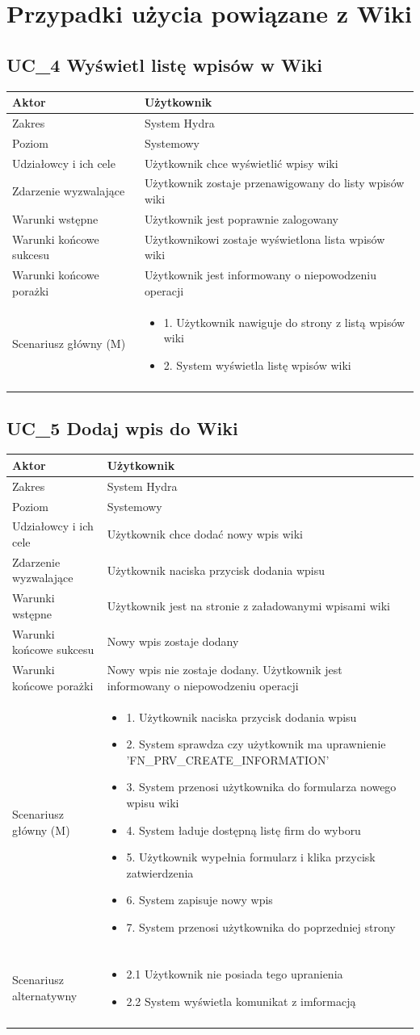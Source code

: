 \documentclass[oneside]{scrreprt}
\newcommand\addheading[2]{#1 &#2\\ \hline}
\newcommand\tabularhead{\begin{center} \begin{tabular}{lp{8cm}}
		\hline
	}
\newcommand\addmulrow[2]{ \begin{minipage}[t][][t]{6cm}#1\end{minipage}%
		&\begin{minipage}[t][][t]{8cm}
			\begin{itemize} #2 \newline \end{itemize}
		\end{minipage}\\ \\  \hline}
\newenvironment{usecase}{\tabularhead}
	{\hline\end{tabular} \end{center}}
\begin{document}
\section{Przypadki użycia powiązane z Wiki}
\subsection{UC\_4 Wyświetl listę wpisów w Wiki}
\begin{usecase}
	\addheading{Aktor}{Użytkownik} 
	\addheading{Zakres}{System Hydra}
	\addheading{Poziom}{Systemowy}
	\addheading{Udziałowcy i ich cele}{Użytkownik chce wyświetlić wpisy wiki}
	\addheading{Zdarzenie wyzwalające}{Użytkownik zostaje przenawigowany do listy wpisów wiki}
	\addheading{Warunki wstępne}{Użytkownik jest poprawnie zalogowany}
	\addheading{Warunki końcowe sukcesu}{Użytkownikowi zostaje wyświetlona lista wpisów wiki}
	\addheading{Warunki końcowe porażki}{Użytkownik jest informowany o niepowodzeniu operacji}
	\addmulrow{Scenariusz główny (M)}{
		\item[] 1. Użytkownik nawiguje do strony z listą wpisów wiki
		\item[] 2. System wyświetla listę wpisów wiki
	}
\end{usecase}
\subsection{UC\_5 Dodaj wpis do Wiki}
\begin{usecase}
	\addheading{Aktor}{Użytkownik} 
	\addheading{Zakres}{System Hydra}
	\addheading{Poziom}{Systemowy}
	\addheading{Udziałowcy i ich cele}{Użytkownik chce dodać nowy wpis wiki}
	\addheading{Zdarzenie wyzwalające}{Użytkownik naciska przycisk dodania wpisu}
	\addheading{Warunki wstępne}{Użytkownik jest na stronie z załadowanymi wpisami wiki}
	\addheading{Warunki końcowe sukcesu}{Nowy wpis zostaje dodany}
	\addheading{Warunki końcowe porażki}{Nowy wpis nie zostaje dodany. Użytkownik jest informowany o niepowodzeniu operacji}
	\addmulrow{Scenariusz główny (M)}{
		\item[] 1. Użytkownik naciska przycisk dodania wpisu
		\item[] 2. System sprawdza czy użytkownik ma uprawnienie 'FN\_PRV\_CREATE\_INFORMATION'
		\item[] 3. System przenosi użytkownika do formularza nowego wpisu wiki
		\item[] 4. System ładuje dostępną listę firm do wyboru
		\item[] 5. Użytkownik wypełnia formularz i klika przycisk zatwierdzenia
		\item[] 6. System zapisuje nowy wpis
		\item[] 7. System przenosi użytkownika do poprzedniej strony
	}
	\addmulrow{Scenariusz alternatywny}{
		\item[] 2.1 Użytkownik nie posiada tego upranienia
		\item[] 2.2 System wyświetla komunikat z imformacją
	}
\end{usecase}
\end{document}
